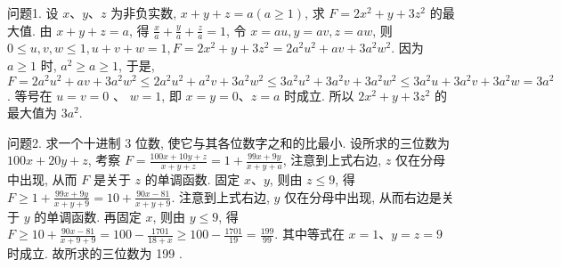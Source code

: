 
问题1. 设 $x 、 y 、 z$ 为非负实数, $x+y+z=a(a \geqslant 1)$, 求 $F=2 x^2+y+3 z^2$ 的最大值.
由 $x+y+z=a$, 得 $\frac{x}{a}+\frac{y}{a}+\frac{z}{a}=1$, 令 $x=a u, y=a v, z=a w$, 则 $0 \leqslant u, v, w \leqslant 1, u+v+w=1, F=2 x^2+y+3 z^2=2 a^2 u^2+a v+3 a^2 w^2$. 因为 $a \geqslant 1$ 时, $a^2 \geqslant a \geqslant 1$, 于是, $F=2 a^2 u^2+a v+3 a^2 w^2 \leqslant 2 a^2 u^2+a^2 v+ 3 a^2 w^2 \leqslant 3 a^2 u^2+3 a^2 v+3 a^2 w^2 \leqslant 3 a^2 u+3 a^2 v+3 a^2 w=3 a^2$. 等号在 $u=v=0$ 、 $w=1$, 即 $x=y=0 、 z=a$ 时成立.
所以 $2 x^2+y+3 z^2$ 的最大值为 $3 a^2$.



问题2. 求一个十进制 3 位数, 使它与其各位数字之和的比最小.
设所求的三位数为 $100 x+20 y+z$, 考察 $F=\frac{100 x+10 y+z}{x+y+z}=1+ \frac{99 x+9 y}{x+y+a}$, 注意到上式右边, $z$ 仅在分母中出现, 从而 $F$ 是关于 $z$ 的单调函数.
固定 $x 、 y$, 则由 $z \leqslant 9$, 得 $F \geqslant 1+\frac{99 x+9 y}{x+y+9}=10+\frac{90 x-81}{x+y+9}$. 注意到上式右边, $y$ 仅在分母中出现, 从而右边是关于 $y$ 的单调函数.
再固定 $x$, 则由 $y \leqslant 9$, 得 $F \geqslant 10+\frac{90 x-81}{x+9+9}=100-\frac{1701}{18+x} \geqslant 100-\frac{1701}{19}=\frac{199}{99}$. 其中等式在 $x=1 、 y=z=9$ 时成立.
故所求的三位数为 199 .



